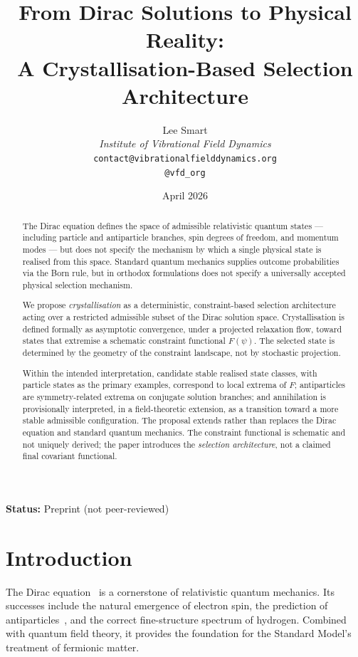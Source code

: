 \documentclass[12pt]{article}
\title{From Dirac Solutions to Physical Reality:\\A Crystallisation-Based Selection Architecture}
\author{%
  Lee Smart\\[4pt]
  \textit{Institute of Vibrational Field Dynamics}\\[2pt]
  \texttt{contact@vibrationalfielddynamics.org}\\[2pt]
  \texttt{@vfd\_org}%
}
\date{April 2026}
\begin{document}
\maketitle

\noindent\textbf{Status:} Preprint (not peer-reviewed)

\begin{abstract}
The Dirac equation defines the space of admissible relativistic quantum states --- including particle and antiparticle branches, spin degrees of freedom, and momentum modes --- but does not specify the mechanism by which a single physical state is realised from this space. Standard quantum mechanics supplies outcome probabilities via the Born rule, but in orthodox formulations does not specify a universally accepted physical selection mechanism.

We propose \textit{crystallisation} as a deterministic, constraint-based selection architecture acting over a restricted admissible subset of the Dirac solution space. Crystallisation is defined formally as asymptotic convergence, under a projected relaxation flow, toward states that extremise a schematic constraint functional $F(\psi)$. The selected state is determined by the geometry of the constraint landscape, not by stochastic projection.

Within the intended interpretation, candidate stable realised state classes, with particle states as the primary examples, correspond to local extrema of $F$; antiparticles are symmetry-related extrema on conjugate solution branches; and annihilation is provisionally interpreted, in a field-theoretic extension, as a transition toward a more stable admissible configuration. The proposal extends rather than replaces the Dirac equation and standard quantum mechanics. The constraint functional is schematic and not uniquely derived; the paper introduces the \textit{selection architecture}, not a claimed final covariant functional.
\end{abstract}

\section{Introduction}\label{sec:intro}

The Dirac equation~\citep{Dirac1928} is a cornerstone of relativistic quantum mechanics. Its successes include the natural emergence of electron spin, the prediction of antiparticles~\citep{Anderson1933}, and the correct fine-structure spectrum of hydrogen. Combined with quantum field theory, it provides the foundation for the Standard Model's treatment of fermionic matter.
\end{document}
